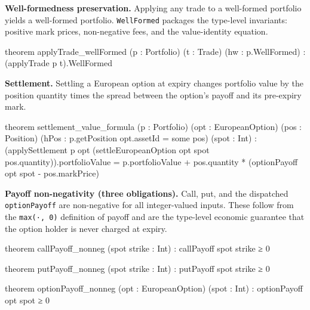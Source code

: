 \documentclass[
  11pt,
  letterpaper,
  DIV=12,
  numbers=noendperiod]{scrartcl}
\newenvironment{Shaded}{\begin{snugshade}}{\end{snugshade}}
\newcommand{\NormalTok}[1]{\textcolor[rgb]{0.00,0.23,0.31}{#1}}
\numberwithin{equation}{section}
\numberwithin{figure}{section}
\numberwithin{table}{section}
\begin{document}
\textbf{Well-formedness preservation.} Applying any trade to a
well-formed portfolio yields a well-formed portfolio.
\texttt{WellFormed} packages the type-level invariants: positive mark
prices, non-negative fees, and the value-identity equation.

\begin{Shaded}
\begin{Highlighting}[]
\NormalTok{theorem applyTrade\_wellFormed (p : Portfolio) (t : Trade)}
\NormalTok{    (hw : p.WellFormed) :}
\NormalTok{    (applyTrade p t).WellFormed}
\end{Highlighting}
\end{Shaded}

\textbf{Settlement.} Settling a European option at expiry changes
portfolio value by the position quantity times the spread between the
option's payoff and its pre-expiry mark.

\begin{Shaded}
\begin{Highlighting}[]
\NormalTok{theorem settlement\_value\_formula (p : Portfolio) (opt : EuropeanOption)}
\NormalTok{    (pos : Position)}
\NormalTok{    (hPos : p.getPosition opt.assetId = some pos)}
\NormalTok{    (spot : Int) :}
\NormalTok{    (applySettlement p opt}
\NormalTok{        (settleEuropeanOption opt spot pos.quantity)).portfolioValue =}
\NormalTok{      p.portfolioValue}
\NormalTok{        + pos.quantity * (optionPayoff opt spot {-} pos.markPrice)}
\end{Highlighting}
\end{Shaded}

\textbf{Payoff non-negativity (three obligations).} Call, put, and the
dispatched \texttt{optionPayoff} are non-negative for all integer-valued
inputs. These follow from the \texttt{max(·,\ 0)} definition of payoff
and are the type-level economic guarantee that the option holder is
never charged at expiry.

\begin{Shaded}
\begin{Highlighting}[]
\NormalTok{theorem callPayoff\_nonneg (spot strike : Int) :}
\NormalTok{    callPayoff spot strike ≥ 0}

\NormalTok{theorem putPayoff\_nonneg (spot strike : Int) :}
\NormalTok{    putPayoff spot strike ≥ 0}

\NormalTok{theorem optionPayoff\_nonneg (opt : EuropeanOption) (spot : Int) :}
\NormalTok{    optionPayoff opt spot ≥ 0}
\end{Highlighting}
\end{Shaded}
\end{document}
